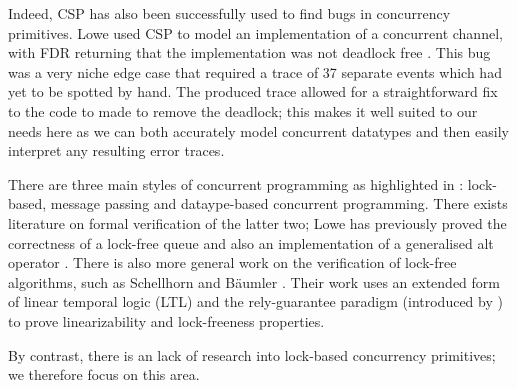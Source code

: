 Indeed, CSP has also been successfully used to find bugs in concurrency primitives. Lowe used CSP to model an implementation of a concurrent channel, with FDR returning that the implementation was not deadlock free \cite{LoweDeadlock}. This bug was a very niche edge case that required a trace of 37 separate events which had yet to be spotted by hand. The produced trace allowed for a straightforward fix to the code to made to remove the deadlock; this makes it well suited to our needs here as we can both accurately model concurrent datatypes and then easily interpret any resulting error traces.

There are three main styles of concurrent programming as highlighted in \cite{CADS}: lock-based, message passing and dataype-based concurrent programming. There exists literature on formal verification of the latter two; Lowe has previously proved the correctness of a lock-free queue\cite{LFQueue} and also an implementation of a generalised alt operator \cite{LoweAlt}. There is also more general work on the verification of lock-free algorithms, such as Schellhorn and B{\"a}umler \cite{Schellhorn}. Their work uses an extended form of linear temporal logic (LTL) and the rely-guarantee paradigm (introduced by \cite{Jones}) to prove linearizability and lock-freeness properties. 

By contrast, there is an lack of research into lock-based concurrency primitives; we therefore focus on this area.




